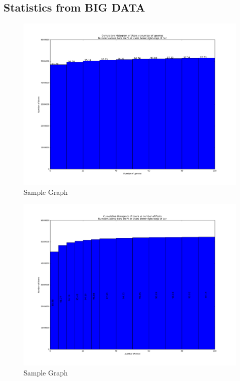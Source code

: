 \documentclass{article}
\begin{document}
\subsection{Statistics from BIG DATA}
\begin{figure}[H]
\centering
\includegraphics[width=12cm]{results_ver2/so_user_cum_hist.png}
\caption{Sample Graph}
\label{fig1:overview}
\end{figure}
\begin{figure}[H]
\centering
\includegraphics[width=12cm]{results_ver2/so_user_postcnt_hist.png}
\caption{Sample Graph}
\label{fig1:overview}
\end{figure}
\end{document}
